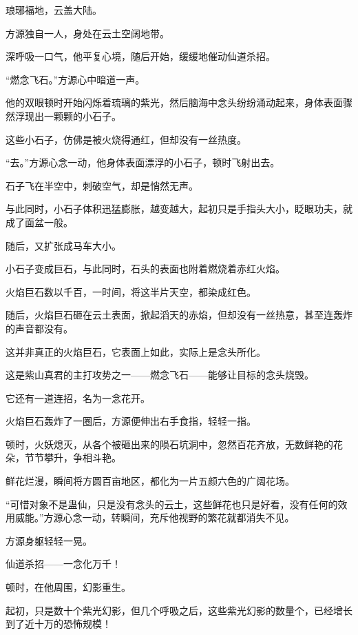 
\begin{this_body}

琅琊福地，云盖大陆。

方源独自一人，身处在云土空阔地带。

深呼吸一口气，他平复心境，随后开始，缓缓地催动仙道杀招。

“燃念飞石。”方源心中暗道一声。

他的双眼顿时开始闪烁着琉璃的紫光，然后脑海中念头纷纷涌动起来，身体表面骤然浮现出一颗颗的小石子。

这些小石子，仿佛是被火烧得通红，但却没有一丝热度。

“去。”方源心念一动，他身体表面漂浮的小石子，顿时飞射出去。

石子飞在半空中，刺破空气，却是悄然无声。

与此同时，小石子体积迅猛膨胀，越变越大，起初只是手指头大小，眨眼功夫，就成了面盆一般。

随后，又扩张成马车大小。

小石子变成巨石，与此同时，石头的表面也附着燃烧着赤红火焰。

火焰巨石数以千百，一时间，将这半片天空，都染成红色。

随后，火焰巨石砸在云土表面，掀起滔天的赤焰，但却没有一丝热意，甚至连轰炸的声音都没有。

这并非真正的火焰巨石，它表面上如此，实际上是念头所化。

这是紫山真君的主打攻势之一——燃念飞石——能够让目标的念头烧毁。

它还有一道连招，名为一念花开。

火焰巨石轰炸了一圈后，方源便伸出右手食指，轻轻一指。

顿时，火妖熄灭，从各个被砸出来的陨石坑洞中，忽然百花齐放，无数鲜艳的花朵，节节攀升，争相斗艳。

鲜花烂漫，瞬间将方圆百亩地区，都化为一片五颜六色的广阔花场。

“可惜对象不是蛊仙，只是没有念头的云土，这些鲜花也只是好看，没有任何的效用威能。”方源心念一动，转瞬间，充斥他视野的繁花就都消失不见。

方源身躯轻轻一晃。

仙道杀招——一念化万千！

顿时，在他周围，幻影重生。

起初，只是数十个紫光幻影，但几个呼吸之后，这些紫光幻影的数量个，已经增长到了近十万的恐怖规模！


\end{this_body}
